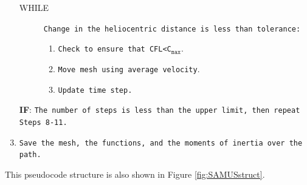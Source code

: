 \documentclass[twocolumn,doublespacing]{aastex631}
\begin{document}
\begin{enumerate}
\begin{description}
            \item[WHILE]\texttt{Change in the heliocentric distance is less than tolerance:}
            \begin{enumerate}
                \item\texttt{Check to ensure that CFL<C}$_{\texttt{max}}$.
                \item\texttt{Move mesh using average velocity}.
                \item\texttt{Update time step.}
            \end{enumerate}
	\end{description}
    \item[\textbf{IF}:]\texttt{The number of steps is less than the upper limit, then repeat Steps 8-11.}
    \item\texttt{Save the mesh, the functions, and the moments of inertia over the path.}
\end{enumerate}

This pseudocode structure is also shown in Figure \ref{fig:SAMUSstruct}.
\end{document}
